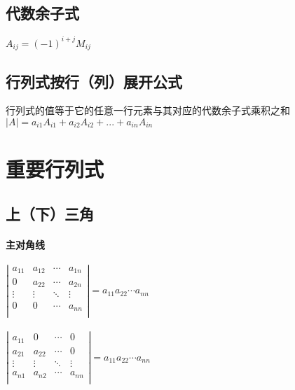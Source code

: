 \documentclass{article}
\begin{document}
\begin{flushleft}
	\subsection{代数余子式}
	$A_{ij}=(-1)^{i+j}M_{ij}$\\
	
	\subsection{行列式按行（列）展开公式}
	行列式的值等于它的任意一行元素与其对应的代数余子式乘积之和
	$|A|=a_{i1}A_{i1}+a_{i2}A_{i2}+...+a_{in}A_{in}$\\
	
	\section{重要行列式}
	
	\subsection{上（下）三角}
	\paragraph{主对角线}
	$\left|\begin{array}{cccc} 
		a_{11}&a_{12}&\cdots&a_{1n}\\ 
		0&a_{22}&\cdots&a_{2n}\\ 
		\vdots&\vdots&\ddots&\vdots\\ 
		0&0&\cdots&a_{nn}\\ 
	\end{array}\right|=a_{11}a_{22}\cdots a_{nn}$\\
	~\\
	$\left|\begin{array}{cccc} 
		a_{11}&0&\cdots&0\\ 
		a_{21}&a_{22}&\cdots&0\\ 
		\vdots&\vdots&\ddots&\vdots\\ 
		a_{n1}&a_{n2}&\cdots&a_{nn}\\ 
	\end{array}\right|=a_{11}a_{22}\cdots a_{nn}$\\


\end{flushleft}
\end{document}
